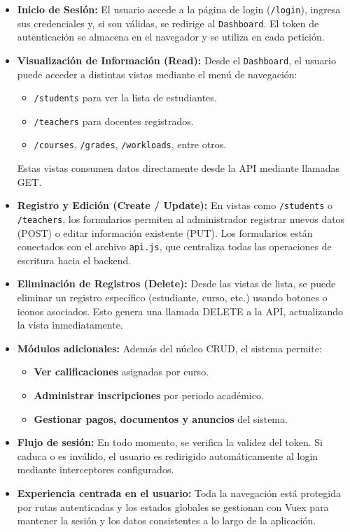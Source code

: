 \documentclass{article}
\begin{document}
\begin{itemize}
    \item \textbf{Inicio de Sesión:} 
    El usuario accede a la página de login (\texttt{/login}), ingresa sus credenciales y, si son válidas, se redirige al \texttt{Dashboard}. El token de autenticación se almacena en el navegador y se utiliza en cada petición.

    \item \textbf{Visualización de Información (Read):}
    Desde el \texttt{Dashboard}, el usuario puede acceder a distintas vistas mediante el menú de navegación: 
    \begin{itemize}
        \item \texttt{/students} para ver la lista de estudiantes.
        \item \texttt{/teachers} para docentes registrados.
        \item \texttt{/courses}, \texttt{/grades}, \texttt{/workloads}, entre otros.
    \end{itemize}
    Estas vistas consumen datos directamente desde la API mediante llamadas GET.

    \item \textbf{Registro y Edición (Create / Update):}
    En vistas como \texttt{/students} o \texttt{/teachers}, los formularios permiten al administrador registrar nuevos datos (POST) o editar información existente (PUT). Los formularios están conectados con el archivo \texttt{api.js}, que centraliza todas las operaciones de escritura hacia el backend.

    \item \textbf{Eliminación de Registros (Delete):}
    Desde las vistas de lista, se puede eliminar un registro específico (estudiante, curso, etc.) usando botones o iconos asociados. Esto genera una llamada DELETE a la API, actualizando la vista inmediatamente.

    \item \textbf{Módulos adicionales:}
    Además del núcleo CRUD, el sistema permite:
    \begin{itemize}
        \item \textbf{Ver calificaciones} asignadas por curso.
        \item \textbf{Administrar inscripciones} por periodo académico.
        \item \textbf{Gestionar pagos, documentos y anuncios} del sistema.
    \end{itemize}

    \item \textbf{Flujo de sesión:}
    En todo momento, se verifica la validez del token. Si caduca o es inválido, el usuario es redirigido automáticamente al login mediante interceptores configurados.

    \item \textbf{Experiencia centrada en el usuario:}
    Toda la navegación está protegida por rutas autenticadas y los estados globales se gestionan con Vuex para mantener la sesión y los datos consistentes a lo largo de la aplicación.
\end{itemize}
\end{document}
